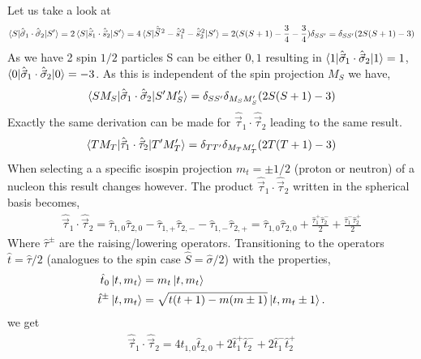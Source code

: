 \documentclass[10pt]{article}
\begin{document}
Let us take a look at
\begin{align*}
	\braket{ S | \hat{ \vec{\sigma}}_{1} \cdot \hat{ \vec{\sigma}}_{2} | S'} = 2 \braket{ S | \hat{ \vec{s}}_{1} \cdot \hat{ \vec{s}}_{2} | S'} = 4 \braket{ S | \hat{\vec{S}}^{\, 2} - \hat{\vec{s}}_{1}^{\,2} - \hat{\vec{s}}_{2}^{\,2} | S'} = 2 ( S(S+1) - \frac{3}{4} - \frac{3}{4} ) \delta_{SS'} = \delta_{SS'} (2 S(S+1) - 3)
\end{align*}
As we have 2 spin $1/2$ particles S can be either $0,1$ resulting in $\braket{ 1 | \hat{ \vec{\sigma}}_{1} \cdot \hat{ \vec{\sigma}}_{2} | 1} = 1$, $\braket{ 0 | \hat{ \vec{\sigma}}_{1} \cdot \hat{ \vec{\sigma}}_{2} | 0} = -3$.
 As this is independent of the spin projection $M_S$ we have,
\begin{align*}
	\braket{ S M_S | \hat{ \vec{\sigma}}_{1} \cdot \hat{ \vec{\sigma}}_{2} | S' M_S'} = \delta_{SS'} \delta_{M_S M_S'} (2 S(S+1) - 3)
\end{align*}
Exactly the same derivation can be made for $\hat{\vec{\tau}}_{1} \cdot \hat{\vec{\tau}}_{2}$ leading to the same result.
\begin{align*}
	\braket{ T M_T | \hat{\vec{\tau}}_{1} \cdot \hat{\vec{\tau}}_{2} | T' M_T'} = \delta_{TT'} \delta_{M_T M_T'} (2 T(T+1) - 3)
\end{align*}
When selecting a a specific isospin projection $m_t = \pm 1/2 $ (proton or neutron) of a nucleon this result changes however.
The product $\hat{\vec{\tau}}_{1} \cdot \hat{\vec{\tau}}_{2}$ written in the spherical basis becomes,
\begin{align*}
	\hat{\vec{\tau}}_{1} \cdot \hat{\vec{\tau}}_{2} = \hat{\tau}_{1,0} \hat{\tau}_{2,0} - \hat{\tau}_{1,+} \hat{\tau}_{2,-} - \hat{\tau}_{1,-} \hat{\tau}_{2,+} = \hat{\tau}_{1,0} \hat{\tau}_{2,0} + \frac{\hat{\tau}_{1}^{+} \hat{\tau}_{2}^{-}}{2} + \frac{ \hat{\tau}_{1}^{-} \hat{\tau}_{2}^{+}}{2}
\end{align*}
Where $\hat{\tau}^{\pm}$ are the raising/lowering operators. Transitioning to the operators $\hat{t} = \hat{\tau}/2$ (analogues to the spin case $\hat{S} = \hat{\sigma}/2$) with the properties,
\begin{align*}
\hat{t}_0 \ket{ t, m_t} &= m_t \ket{ t, m_t} \\
\hat{t}^{\pm} \ket{ t, m_t} &= \sqrt{ t(t+1) - m(m \pm 1)} \ket { t, m_t \pm 1}.
\end{align*}
we get
\begin{align*}
	\hat{\vec{\tau}}_{1} \cdot \hat{\vec{\tau}}_{2} = 4 \hat{t}_{1,0} \hat{t}_{2,0} + 2 \hat{t}_{1}^{+} \hat{t}_{2}^{-} + 2 \hat{t}_{1}^{-} \hat{t}_{2}^{+} 
\end{align*}
\end{document}
